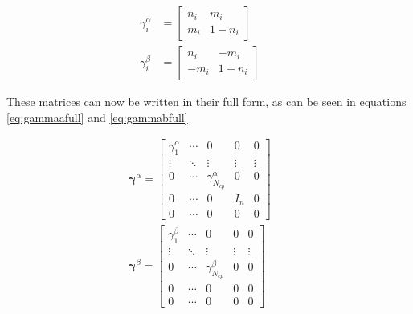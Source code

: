 \documentclass[twoside,twocolumn,9pt]{article}
\begin{document}
\begin{subequations}
  \begin{align}
    \label{eq:gammaa}
    \gamma^\alpha_i & = \begin{bmatrix}
      n_i & m_i    \\
      m_i & 1- n_i
    \end{bmatrix}  &  & \\
    \label{eq:gammab}
    \gamma^\beta_i  & = \begin{bmatrix}
      n_i  & -m_i  \\
      -m_i & 1-n_i
    \end{bmatrix} &  &
  \end{align}
\end{subequations}

These matrices can now be written in their full form, as can be seen in equations \eqref{eq:gammaafull} and \eqref{eq:gammabfull}

\begin{subequations}
  \begin{align}
    \label{eq:gammaafull}
    \mathbf{\gamma}^\alpha = \begin{bmatrix}
      \gamma^\alpha_1 & \cdots & 0                      & 0      & 0      \\
      \vdots          & \ddots & \vdots                 & \vdots & \vdots \\
      0               & \cdots & \gamma^\alpha_{N_{cp}} & 0      & 0      \\
      0               & \cdots & 0                      & I_n    & 0      \\
      0               & \cdots & 0                      & 0      & 0
    \end{bmatrix} &  & \\
    \label{eq:gammabfull}
    \mathbf{\gamma}^\beta = \begin{bmatrix}
      \gamma^\beta_1 & \cdots & 0                     & 0      & 0      \\
      \vdots         & \ddots & \vdots                & \vdots & \vdots \\
      0              & \cdots & \gamma^\beta_{N_{cp}} & 0      & 0      \\
      0              & \cdots & 0                     & 0      & 0      \\
      0              & \cdots & 0                     & 0      & 0
    \end{bmatrix}  &  &
  \end{align}
\end{subequations}
\end{document}
